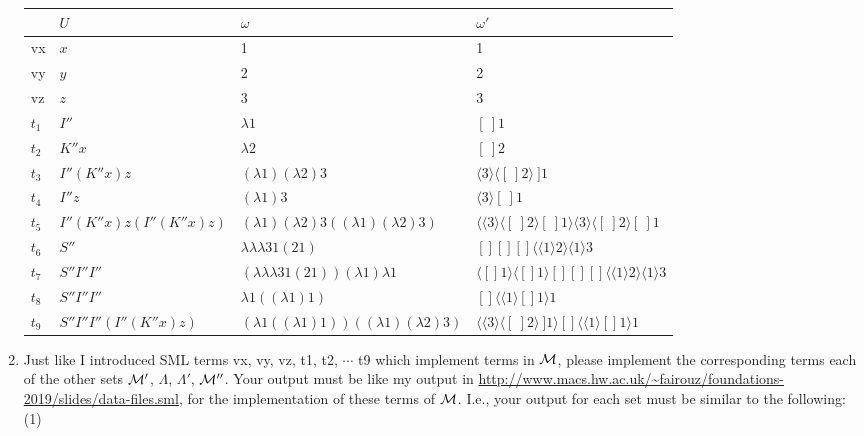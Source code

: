 \documentclass[11pt]{article}
\newcommand \cM {\cal M}
\begin{document}
\begin{enumerate}
	      \begin{tabular}{|l|l|l|l|}
	      	\hline
	      	         & $U$      & $\omega$    & $\omega'$ \\
	      	\hline
	      	vx       & $x$      & 1           & 1         \\
	      	\hline
	      	vy       & $y$      & 2           & 2         \\
	      	\hline
	      	vz       & $z$     & 3           & 3         \\
	      	\hline
	      	$t_1$    & $I''$    & $\lambda 1$ & $[\:]1$   \\
	      	\hline
	      	$t_2$    & $K''x$   & $\lambda 2$ & $[\:]2$         \\
	      	\hline
	      	$t_3$    & $I'' (K''x) z$   & $(\lambda 1)(\lambda 2)3$    & $\langle 3 \rangle \langle [\:]2 \rangle\:]1 $         \\
	      	\hline
	      	$t_4$    & $I''z$        & $(\lambda 1) 3$           & $\langle 3 \rangle [\:]1$         \\
	      	\hline
	      	$t_5$
	      	         & $I'' (K''x) z(I'' (K''x) z)$        & $(\lambda 1)(\lambda 2)3((\lambda 1)(\lambda 2)3)$           & $\langle \langle 3\rangle \langle [\:]2 \rangle [\:]1 \rangle\langle 3\rangle \langle [\:]2 \rangle [\:]1$         \\
	      	\hline
	      	$t_6$    & $S''$        & $\lambda \lambda \lambda 31(21)$           & $[][][]\langle \langle 1 \rangle 2 \rangle \langle 1 \rangle 3$         \\
	      	\hline
	      	$t_7$    & $S'' I'' I''$        & $(\lambda \lambda \lambda 31(21))(\lambda 1)\lambda 1$           & $\langle []1 \rangle \langle []1 \rangle [][][]\langle \langle 1 \rangle 2 \rangle \langle 1 \rangle 3$         \\
	      	\hline
	      	$t_8$    & $S'' I'' I''$        & $\lambda 1 ((\lambda 1)1)$           & $[]\langle \langle 1 \rangle []1 \rangle 1$         \\
	      	\hline
	      	$t_9$    & $S'' I'' I''(I'' (K''x) z)$        & $(\lambda 1 ((\lambda 1)1))((\lambda 1)(\lambda 2)3)$           &$\langle \langle 3 \rangle \langle [\:]2 \rangle\:]1 \rangle []\langle \langle 1 \rangle []1 \rangle 1$         \\
	      	\hline
	      \end{tabular}
	            
	      \color{black}
	      
	\item
	      Just like I introduced SML terms vx, vy, vz, t1, t2, $\cdots$ t9
	      which implement terms in  $\cM$, please implement the corresponding terms each of the other sets $\cM'$, $\Lambda$, $\Lambda'$, $\cM''$.  Your output must be like my output in
	      \url{http://www.macs.hw.ac.uk/~fairouz/foundations-2019/slides/data-files.sml},
	      for the implementation of these terms of $\cM$. I.e., your output for each set must be similar to the following:
	      \hfill{(1)} %
	      

\end{enumerate}
\end{document}
